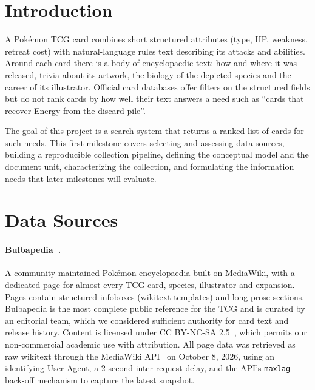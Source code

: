 \documentclass[sigconf]{acmart}
\begin{document}

  \maketitle


  \section{Introduction}

  A Pok\'emon TCG card combines short structured attributes (type, HP,
  weakness, retreat cost) with natural-language rules text describing
  its attacks and abilities. Around each card there is a body of
  encyclopaedic text: how and where it was released, trivia about its
  artwork, the biology of the depicted species and the career of its
  illustrator. Official card databases offer filters on the structured
  fields but do not rank cards by how well their text answers a need such
  as ``cards that recover Energy from the discard pile''.

  The goal of this project is a search system that returns a ranked list of
  cards for such needs. This first milestone covers selecting and assessing
  data sources, building a reproducible collection pipeline, defining the
  conceptual model and the document unit, characterizing the collection,
  and formulating the information needs that later milestones will evaluate.


  \section{Data Sources}

  \paragraph{Bulbapedia~\cite{bulbapedia}.}
  A community-maintained Pok\'emon encyclopaedia built on MediaWiki, with
  a dedicated page for almost every TCG card, species, illustrator and
  expansion. Pages contain structured infoboxes (wikitext templates) and
  long prose sections. Bulbapedia is the most complete public reference for
  the TCG and is curated by an editorial team, which we considered sufficient
  authority for card text and release history. Content is licensed under
  CC BY-NC-SA 2.5~\cite{ccbyncsa}, which permits our non-commercial academic
  use with attribution. 
  All page data was retrieved as raw wikitext through the
  MediaWiki API~\cite{mediawikiapi} on October 8, 2026, using an identifying User-Agent,
  a 2-second inter-request delay, and the API's \texttt{maxlag} back-off mechanism to capture the latest snapshot.
\end{document}
